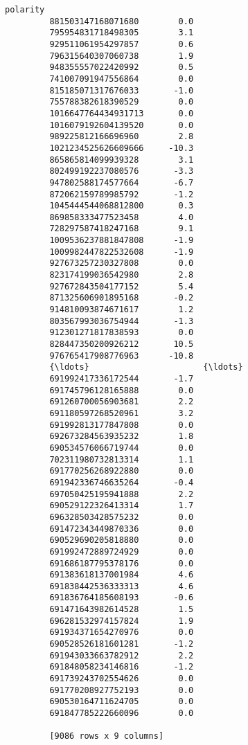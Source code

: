 \documentclass[11pt]{article}
\begin{document}
\begin{Verbatim}[commandchars=\\\{\}]
                              polarity  
         881503147168071680        0.0  
         795954831718498305        3.1  
         929511061954297857        0.6  
         796315640307060738        1.9  
         948355557022420992        0.5  
         741007091947556864        0.0  
         815185071317676033       -1.0  
         755788382618390529        0.0  
         1016647764434931713       0.0  
         1016079192604139520       0.0  
         989225812166696960        2.8  
         1021234525626609666     -10.3  
         865865814099939328        3.1  
         802499192237080576       -3.3  
         947802588174577664       -6.7  
         872062159789985792       -1.2  
         1045444544068812800       0.3  
         869858333477523458        4.0  
         728297587418247168        9.1  
         1009536237881847808      -1.9  
         1009982447822532608      -1.9  
         927673257230327808        0.0  
         823174199036542980        2.8  
         927672843504177152        5.4  
         871325606901895168       -0.2  
         914810093874671617        1.2  
         803567993036754944       -1.3  
         912301271817838593        0.0  
         828447350200926212       10.5  
         976765417908776963      -10.8  
         {\ldots}                       {\ldots}  
         691992417336172544       -1.7  
         691745796128165888        0.0  
         691260700056903681        2.2  
         691180597268520961        3.2  
         691992813177847808        0.0  
         692673284563935232        1.8  
         690534576066719744        0.0  
         702311980732813314        1.1  
         691770256268922880        0.0  
         691942336746635264       -0.4  
         697050425195941888        2.2  
         690529122326413314        1.7  
         696328503428575232        0.0  
         691472343449870336        0.0  
         690529690205818880        0.0  
         691992472889724929        0.0  
         691686187795378176        0.0  
         691383618137001984        4.6  
         691838442536333313        4.6  
         691836764185608193       -0.6  
         691471643982614528        1.5  
         696281532974157824        1.9  
         691934371654270976        0.0  
         690528526181601281       -1.2  
         691943033663782912        2.2  
         691848058234146816       -1.2  
         691739243702554626        0.0  
         691770208927752193        0.0  
         690530164711624705        0.0  
         691847785222660096        0.0  
         
         [9086 rows x 9 columns]
\end{Verbatim}
            
\end{document}
